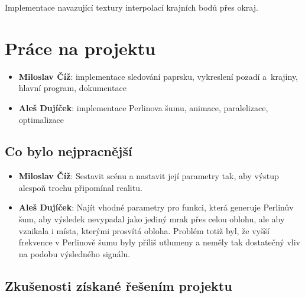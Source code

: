 \documentclass[12pt,a4paper,titlepage,final]{report}
\newcommand\AuthorA{Miloslav Číž}
\newcommand\AuthorB{Aleš Dujíček}
\begin{document}
Implementace navazující textury interpolací krajních bodů přes okraj.






\chapter{Práce na projektu}

\begin{itemize}
\item \textbf{\AuthorA}: implementace sledování paprsku, vykreslení pozadí a~krajiny, hlavní program, dokumentace
\item \textbf{\AuthorB}: implementace Perlinova šumu, animace, paralelizace, optimalizace
\end{itemize}

\section{Co bylo nejpracnější}


\begin{itemize}
\item \textbf{\AuthorA}: Sestavit scénu a nastavit její parametry tak,
aby výstup alespoň trochu připomínal realitu.
\item \textbf{\AuthorB}: Najít vhodné parametry pro funkci, která generuje
Perlinův šum, aby výsledek nevypadal jako jediný mrak přes celou oblohu,
ale aby vznikala i místa, kterými prosvítá obloha. Problém totiž byl, že vyšší
frekvence v Perlinově šumu byly příliš utlumeny a neměly tak dostatečný vliv
na podobu výsledného signálu.
\end{itemize}

\section{Zkušenosti získané řešením projektu}
\end{document}
